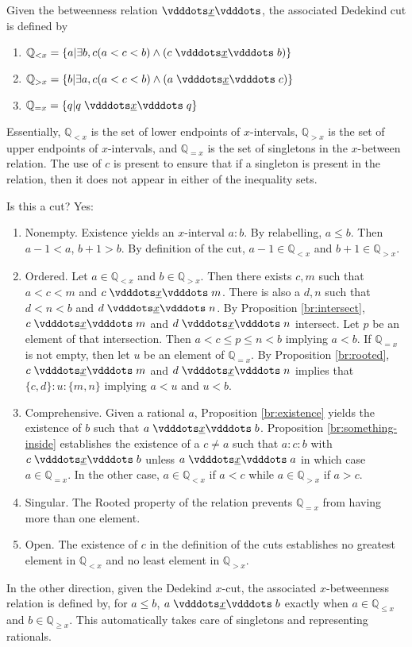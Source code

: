 \documentclass[12pt]{article}
\newcommand{\qcut}[2][x]{\ensuremath{\mathbb{Q}_{#2 #1}}}
\newcommand{\qlt}[1][x]{\qcut[#1]{<}}
\newcommand{\qeq}[1][x]{\qcut[#1]{=}}
\newcommand{\qgt}[1][x]{\qcut[#1]{>}}
\newcommand{\qgeq}[1][x]{\qcut[#1]{\geq}}
\newcommand{\qleq}[1][x]{\qcut[#1]{\leq}}
\begin{document}
Given the betweenness relation $\xrel$, the associated Dedekind cut is defined by \begin{enumerate}
    \item $\qlt = \{ a | \exists b, c (a < c < b) \wedge (c \xrel b) \} $
    \item $\qgt = \{ b | \exists a, c (a < c < b) \wedge (a \xrel c) \} $
    \item $\qeq = \{ q | q \xrel q \} $
\end{enumerate}
Essentially, $\qlt$ is the set of lower endpoints of $x$-intervals, $\mathbb{Q}_{>x}$ is the set of upper endpoints of $x$-intervals, and $\qeq$ is the set of singletons in the $x$-between relation. The use of $c$ is present to ensure that if a singleton is present in the relation, then it does not appear in either of the inequality sets. 

Is this a cut? Yes: 
\begin{enumerate}
    \item Nonempty. Existence yields an $x$-interval $a:b$. By relabelling, $a \leq b$. Then $a-1< a$, $b+1 > b$. By definition of the cut, $a-1 \in \qlt$ and $b+1 \in \qgt$.
    \item Ordered. Let $a \in \qlt$ and $b \in \qgt$.  Then there exists $c, m$ such that $a < c < m$ and $c \xrel m$. There is also a $d, n$ such that $d < n< b$  and $d \xrel n$. By Proposition \ref{br:intersect}, $c \xrel m$ and $d \xrel n$ intersect. Let $p$ be an element of that intersection. Then $a < c \leq p \leq n < b$ implying $a < b$.  If $\qeq$ is not empty, then let $u$ be an element of $\qeq$. By Proposition \ref{br:rooted}, $c \xrel m$ and $d \xrel n$ implies that $\{c,d\}:u:\{m,n\}$ implying $a < u$ and $u < b$. 
    \item Comprehensive. Given a rational $a$, Proposition \ref{br:existence} yields the existence of $b$ such that $a \xrel b$. Proposition \ref{br:something-inside} establishes the existence of a $c \neq a$ such that $a:c:b$ with $c \xrel b$ unless $a \xrel a$ in which case $a \in \qeq$. In the other case, $a \in \qlt$ if $a < c$ while $a  \in \qgt$ if $a > c$. 
    \item Singular. The Rooted property of the relation prevents $\qeq$ from having more than one element. 
    \item Open. The existence of $c$ in the definition of the cuts establishes no greatest element in $\qlt$ and no least element in $\qgt$. 
\end{enumerate}

In the other direction, given the Dedekind $x$-cut, the associated $x$-betweenness relation is defined by, for $a \leq b$, $a \xrel b$ exactly when $a \in \qleq$ and $b \in \qgeq$. This automatically takes care of singletons and representing rationals. 
\end{document}
